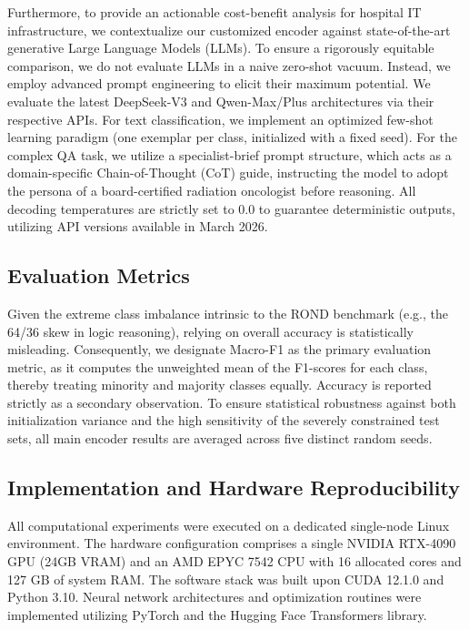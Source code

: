 \documentclass[a4paper,fleqn]{cas-dc}
\begin{document}
Furthermore, to provide an actionable cost-benefit analysis for hospital IT infrastructure, we contextualize our customized encoder against state-of-the-art generative Large Language Models (LLMs). To ensure a rigorously equitable comparison, we do not evaluate LLMs in a naive zero-shot vacuum. Instead, we employ advanced prompt engineering to elicit their maximum potential. We evaluate the latest DeepSeek-V3\cite{liu2024deepseek} and Qwen-Max/Plus\cite{bai2023qwen} architectures via their respective APIs. For text classification, we implement an optimized few-shot learning paradigm (one exemplar per class, initialized with a fixed seed). For the complex QA task, we utilize a specialist-brief prompt structure, which acts as a domain-specific Chain-of-Thought (CoT) guide, instructing the model to adopt the persona of a board-certified radiation oncologist before reasoning. All decoding temperatures are strictly set to 0.0 to guarantee deterministic outputs, utilizing API versions available in March 2026.

\subsection{Evaluation Metrics}
Given the extreme class imbalance intrinsic to the ROND benchmark (e.g., the 64/36 skew in logic reasoning), relying on overall accuracy is statistically misleading. Consequently, we designate Macro-F1 as the primary evaluation metric, as it computes the unweighted mean of the F1-scores for each class, thereby treating minority and majority classes equally. Accuracy is reported strictly as a secondary observation. To ensure statistical robustness against both initialization variance and the high sensitivity of the severely constrained test sets, all main encoder results are averaged across five distinct random seeds.

\subsection{Implementation and Hardware Reproducibility}
All computational experiments were executed on a dedicated single-node Linux environment. The hardware configuration comprises a single NVIDIA RTX-4090 GPU (24GB VRAM) and an AMD EPYC 7542 CPU with 16 allocated cores and 127 GB of system RAM. The software stack was built upon CUDA 12.1.0 and Python 3.10. Neural network architectures and optimization routines were implemented utilizing PyTorch and the Hugging Face Transformers library.
\end{document}
